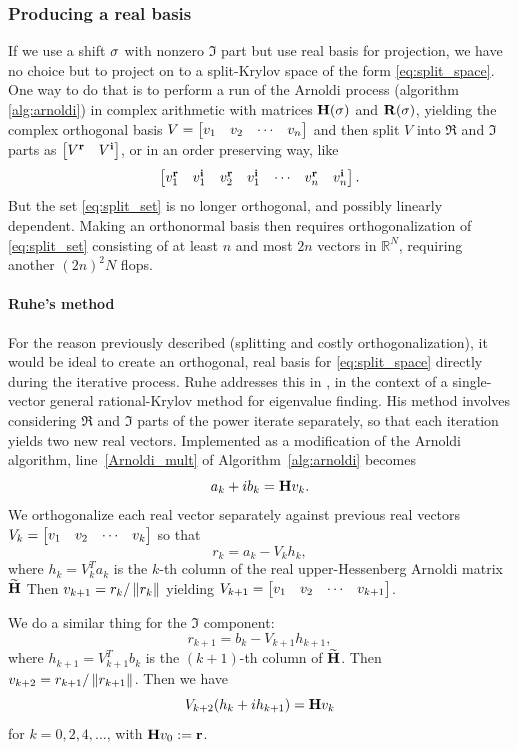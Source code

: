  \subsubsection{Producing a real basis}\label{sec:eqreal}
 If we use a shift $\sigma$ with nonzero $\Im$ part but use real basis for projection, we have no choice but to project on to a split-Krylov space of the form \eqref{eq:split_space}.   One way to do that is to perform a run of the Arnoldi process (algorithm \ref{alg:arnoldi}) in complex arithmetic with matrices $\textbf{\textup{H}}(\sigma)$ and $\textbf{\textup{R}}(\sigma)$, yielding the  complex orthogonal basis $V = \begin{bmatrix} v_1 & v_2 & \cdots & v_n\end{bmatrix}$ and then split $V$ into $\Re$ and $\Im$ parts as $\begin{bmatrix} V^{\mathrm{\bf{r}}}_{} & V^{\mathrm{\bf{i}}}_{}\end{bmatrix}$, or in an order preserving way, like
\begin{equation}
\begin{bmatrix} v^{\mathrm{\bf{r}}}_{1} & v^{\mathrm{\bf{i}}}_{1} & v^{\mathrm{\bf{r}}}_{2} & v^{\mathrm{\bf{i}}}_{1} & \cdots &  v^{\mathrm{\bf{r}}}_{n} & v^{\mathrm{\bf{i}}}_{n} \end{bmatrix}.
\label{eq:split_set}
\end{equation}
But the set \eqref{eq:split_set} is no longer orthogonal, and possibly linearly dependent.  Making an orthonormal basis then  requires orthogonalization of \eqref{eq:split_set} consisting of at least $n$ and most $2n$ vectors in $\mathbb{R}^N$, requiring another $(2n)^2 N$ flops.

\paragraph{Ruhe's method}
For the reason previously described (splitting and costly orthogonalization), it would be ideal to create an orthogonal, real basis for \eqref{eq:split_space} directly during the iterative process.   Ruhe addresses this in \cite{ruhe1994rational}, in the context of a single-vector general rational-Krylov method for eigenvalue finding.  His method involves considering $\Re$ and $\Im$ parts of the power iterate separately, so that each iteration yields two new real vectors.  Implemented as a modification of the Arnoldi algorithm, line~\ref{Arnoldi_mult} of Algorithm~\ref{alg:arnoldi} becomes
\[ 
a_k + i b_k = \textbf{\textup{H}} v_k.  
\]
We orthogonalize each real vector separately against previous real vectors $V_k = \begin{bmatrix} v_1 & v_2 & \cdots & v_k\end{bmatrix}$ so that
\[
r_k = a_k - V_k h_k,  
\]
where $h_k = V_k^T a_k$ is the $k$-th column of the real upper-Hessenberg Arnoldi matrix $\widetilde{\textbf{\textup{H}}}$
Then $v_{k+1}=r_k/\left\| r_k \right\|_{}$ yielding $V_{k+1} = \begin{bmatrix} v_1 & v_2 & \cdots & v_{k+1}\end{bmatrix}$. 

We do a similar thing for the $\Im$ component: 
\[
r_{k+1} =  b_k-V_{k+1} h_{k+1},  
\]
 where $h_{k+1} = V_{k+1}^T b_k$ is the $(k+1)$-th column of $\widetilde{\textbf{\textup{H}}}$. Then $v_{k+2} = r_{k+1}/\left\| r_{k+1} \right\|_{}$.
Then we have 
\[
V_{k+2} (h_k + i h_{k+1}) = \textbf{\textup{H}} v_k
\]
for $k=0,2,4,\ldots$, with $\textbf{\textup{H}} v_0:=\textbf{\textup{r}}$.


